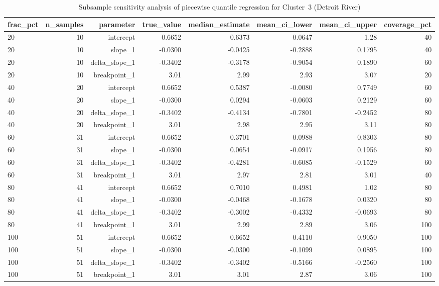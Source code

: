 \begin{table}[htbp]
  \centering
  \caption{Subsample sensitivity analysis of piecewise quantile regression for Cluster~3 (Detroit River)}
  \label{tab:dr_05_piecewise_qr_sensitivity_cluster_3}
  \small
  \begin{tabular}{lrrrrrrr}
    \toprule
    frac\_pct & n\_samples & parameter & true\_value & median\_estimate & mean\_ci\_lower & mean\_ci\_upper & coverage\_pct \\
    \midrule
    20 & 10 & intercept & 0.6652 & 0.6373 & 0.0647 & 1.28 & 40 \\
    20 & 10 & slope\_1 & -0.0300 & -0.0425 & -0.2888 & 0.1795 & 40 \\
    20 & 10 & delta\_slope\_1 & -0.3402 & -0.3178 & -0.9054 & 0.1890 & 60 \\
    20 & 10 & breakpoint\_1 & 3.01 & 2.99 & 2.93 & 3.07 & 20 \\
    40 & 20 & intercept & 0.6652 & 0.5387 & -0.0080 & 0.7749 & 60 \\
    40 & 20 & slope\_1 & -0.0300 & 0.0294 & -0.0603 & 0.2129 & 60 \\
    40 & 20 & delta\_slope\_1 & -0.3402 & -0.4134 & -0.7801 & -0.2452 & 80 \\
    40 & 20 & breakpoint\_1 & 3.01 & 2.98 & 2.95 & 3.11 & 80 \\
    60 & 31 & intercept & 0.6652 & 0.3701 & 0.0988 & 0.8303 & 80 \\
    60 & 31 & slope\_1 & -0.0300 & 0.0654 & -0.0917 & 0.1956 & 80 \\
    60 & 31 & delta\_slope\_1 & -0.3402 & -0.4281 & -0.6085 & -0.1529 & 60 \\
    60 & 31 & breakpoint\_1 & 3.01 & 2.97 & 2.81 & 3.01 & 40 \\
    80 & 41 & intercept & 0.6652 & 0.7010 & 0.4981 & 1.02 & 80 \\
    80 & 41 & slope\_1 & -0.0300 & -0.0468 & -0.1678 & 0.0320 & 80 \\
    80 & 41 & delta\_slope\_1 & -0.3402 & -0.3002 & -0.4332 & -0.0693 & 80 \\
    80 & 41 & breakpoint\_1 & 3.01 & 2.99 & 2.89 & 3.06 & 100 \\
    100 & 51 & intercept & 0.6652 & 0.6652 & 0.4110 & 0.9050 & 100 \\
    100 & 51 & slope\_1 & -0.0300 & -0.0300 & -0.1099 & 0.0895 & 100 \\
    100 & 51 & delta\_slope\_1 & -0.3402 & -0.3402 & -0.5166 & -0.2560 & 100 \\
    100 & 51 & breakpoint\_1 & 3.01 & 3.01 & 2.87 & 3.06 & 100 \\
    \bottomrule
  \end{tabular}
\end{table}
